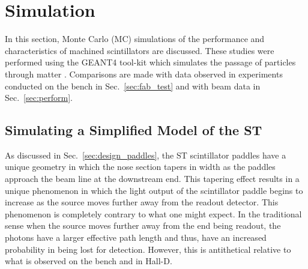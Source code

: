 \section{Simulation} \label{sec:sim}

In this section, Monte Carlo (MC) simulations of the performance and characteristics of machined scintillators are discussed.  These studies were performed using the GEANT4 tool-kit which simulates the passage of particles through matter \cite{geant4_website}.  Comparisons are made with data observed in experiments conducted on the bench in Sec.~\ref{sec:fab_test} and with beam data in Sec.~\ref{sec:perform}.  


\subsection{Simulating a Simplified Model of the ST} \label{sec:sim_simple}

As discussed in Sec.~\ref{sec:design_paddles}, the ST scintillator paddles have a unique geometry in which the nose section tapers in width as the paddles approach the beam line at the downstream end.  This tapering effect results in a unique phenomenon in which the light output of the scintillator paddle begins to increase as the source moves further away from the readout detector.  This phenomenon is completely contrary to what one might expect. In the traditional sense when the source moves further away from the end being readout, the photons have a larger effective path length and thus, have an increased probability in being lost for detection.  However, this is antithetical relative to what is observed on the bench and in Hall-D.

